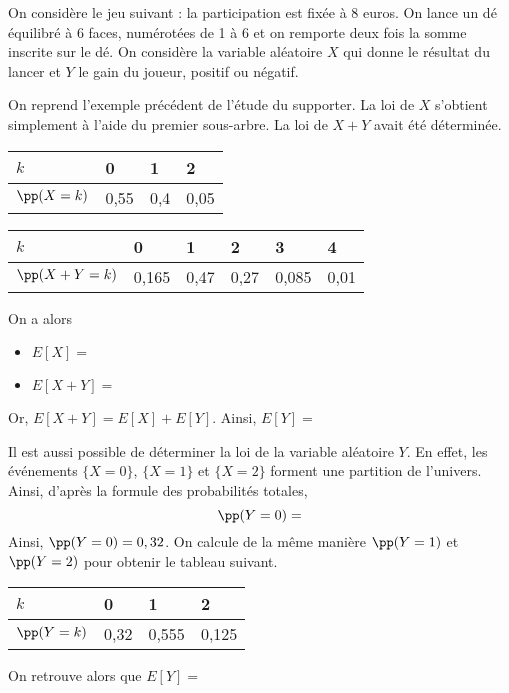 \documentclass[11pt,fleqn, openany]{book} %
\begin{document}
\begin{example} On considère le jeu suivant : la participation est fixée à 8 euros. On lance un dé équilibré à 6 faces, numérotées de 1 à 6 et on remporte deux fois la somme inscrite sur le dé. On considère la variable aléatoire $X$ qui donne le résultat du lancer et $Y$ le gain du joueur, positif ou négatif. 
\vskip30pt
\end{example}

\begin{example}On reprend l'exemple précédent de l'étude du supporter. La loi de $X$ s'obtient simplement à l'aide du premier sous-arbre. La loi de $X+Y$ avait été déterminée.

\begin{minipage}{0.35\linewidth}

\renewcommand{\arraystretch}{1.5}
\begin{tabularx}{\linewidth}{|l|X|X|X|}
\hline
$k$ & 0 & 1 & 2  \\
\hline
$\pp(X=k)$ & 0,55 & 0,4 & 0,05  \\
\hline
\end{tabularx}
\end{minipage}\hfill\begin{minipage}{0.6\linewidth}
\renewcommand{\arraystretch}{1.5}
\begin{tabularx}{\linewidth}{|l|X|X|X|X|X|}
\hline
$k$ & 0 & 1 & 2 & 3 & 4 \\
\hline
$\pp(X+Y=k)$ & 0,165 & 0,47 & 0,27 & 0,085&0,01 \\
\hline
\end{tabularx}

\end{minipage}

On a alors 
\begin{itemize}
\item $E[X]=$
\item $E[X+Y]=$
\end{itemize}

Or, $E[X+Y]=E[X]+E[Y]$. Ainsi, $E[Y]=$

Il est aussi possible de déterminer la loi de la variable aléatoire $Y$. En effet, les événements $\{X=0\}$, $\{X=1\}$ et $\{X=2\}$ forment une partition de l'univers. Ainsi, d'après la formule des probabilités totales,
\[\pp(Y=0)=\]
Ainsi, $\pp(Y=0)=0,32$. On calcule de la même manière $\pp(Y=1)$ et $\pp(Y=2)$ pour obtenir le tableau suivant.
\begin{center}
\renewcommand{\arraystretch}{1.5}
\begin{tabularx}{0.6\linewidth}{|l|X|X|X|}
\hline
$k$ & 0 & 1 & 2  \\
\hline
$\pp(Y=k)$ & 0,32 & 0,555 & 0,125  \\
\hline
\end{tabularx}
\end{center}

On retrouve alors que $E[Y] =$
\end{example}
\end{document}
